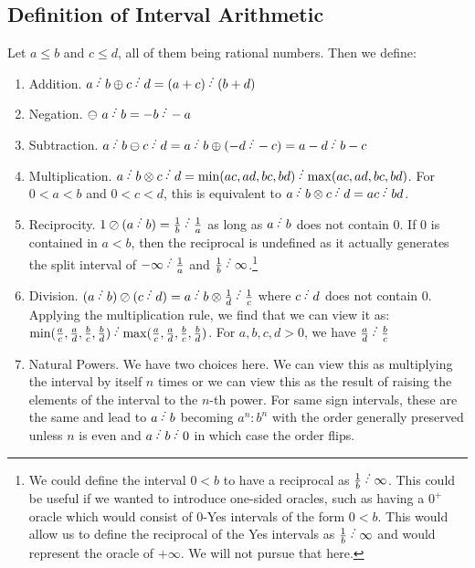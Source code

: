 \documentclass[12pt]{article}
\begin{document}
\subsection{Definition of Interval Arithmetic}

Let $a \leq b$ and $c \leq d$, all of them being rational numbers. Then we define:
\begin{enumerate}
    \item Addition. $a\lte b \oplus c\lte d = (a+c)\lte (b+d)$
    \item Negation. $\ominus\ a\lte b = -b\lte -a$
    \item Subtraction. $a\lte b \ominus c\lte d = a\lte b \oplus (-d\lte -c) = a-d\lte b-c$
    \item Multiplication. $a\lte b \otimes c\lte d = \min(ac, ad, bc, bd)\lte  \max(ac,ad,bc,bd)$. For $0<a<b$ and $0<c<d$, this is equivalent to $a\lte b \otimes c\lte d = ac\lte bd$. 
    \item Reciprocity. $1 \oslash (a\lte b) = \frac{1}{b}\lte \frac{1}{a}$ as long as $a\lte b$ does not contain 0. If 0 is contained in $a \lt b$, then the reciprocal is undefined as it actually generates the split interval of $-\infty\lte \frac{1}{a}$ and $\frac{1}{b}\lte \infty$.\footnote{We could define the interval $0 \lt b$ to have a reciprocal as $\frac{1}{b}\lte \infty$. This could be useful if we wanted to introduce one-sided oracles, such as having a $0^+$ oracle which would consist of $0$-Yes intervals of the form $0\lt b$. This would allow us to define the reciprocal of the Yes intervals as $\frac{1}{b}\lte \infty$ and would represent the oracle of $+ \infty$. We will not pursue that here.  }
    \item Division. $(a\lte b) \oslash (c\lte d) = a\lte b \otimes \frac{1}{d}\lte \frac{1}{c}$ where $c\lte d$ does not contain 0. Applying the multiplication rule, we find that we can view it as:   $\min(\frac{a}{c}, \frac{a}{d}, \frac{b}{c}, \frac{b}{d})\lte  \max(\frac{a}{c},\frac{a}{d},\frac{b}{c},\frac{b}{d})$. For $a, b, c, d > 0$, we have $\frac{a}{d} \lte  \frac{b}{c}$
    \item Natural Powers. We have two choices here. We can view this as multiplying the interval by itself $n$ times or we can view this as the result of raising the elements of the interval to the $n$-th power. For same sign intervals, these are the same and lead to $a\lte b$ becoming $a^n : b^n$  with the order generally preserved unless $n$ is even and $a \lte b \lte 0$ in which case the order flips. 
    

\end{enumerate}
\end{document}
